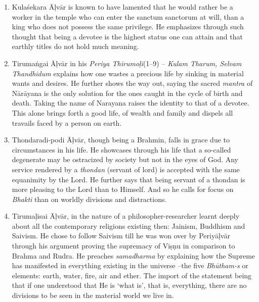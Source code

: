 \begin{enumerate}[{\rm 1.}]
 \item Kulaśekara Āḷvār is known to have lamented that he would rather be a worker in the temple who can enter the sanctum sanctorum at will, than a king who does not possess the same privilege. He emphasizes through such thought that being a devotee is the highest status one can attain and that earthly titles do not hold much meaning.

 \item Tirumaṅgai Āḷvār in his \textit{Periya Thirumoḷi}(1–9) – \textit{Kulam Tharum, Selvam Thandhidum }explains how one wastes a precious life by sinking in material wants and desires. He further shows the way out, saying the sacred \textit{mantra} of Nārāyana is the only solution for the ones caught in the cycle of birth and death. Taking the name of Narayana raises the identity to that of a devotee. This alone brings forth a good life, of wealth and family and dispels all travails faced by a person on earth.

 \item Thondaradi-podi Āḷvār, though being a Brahmin, falls in grace due to circumstances in his life. He showcases through his life that a so-called degenerate may be ostracized by society but not in the eyes of God. Any service rendered by a \textit{thondan }(servant of lord) is accepted with the same equanimity by the Lord. He further says that being servant of a thondan is more pleasing to the Lord than to Himself. And so he calls for focus on \textit{Bhakti} than on worldly divisions and distractions.

 \item Tirumaḷisai Āḷvār, in the nature of a philosopher-researcher learnt deeply about all the contemporary religions existing then: Jainism, Buddhism and Saivism. He chose to follow Saivism till he was won over by Periyāḷvār through his argument proving the supremacy of Viṣṇu in comparison to Brahma and Rudra. He preaches \textit{samadharma} by explaining how the Supreme has manifested in everything existing in the universe –the five \textit{Bhūtham-s} or elements: earth, water, fire, air and ether. The import of the statement being that if one understood that He is ‘what is’, that is, everything, there are no divisions to be seen in the material world we live in.


\end{enumerate}

